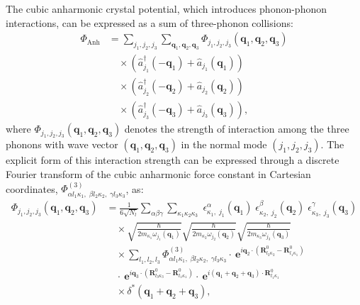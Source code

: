 The cubic anharmonic crystal potential, which introduces phonon-phonon interactions, can be expressed as a sum of three-phonon collisions:
\begin{equation}
\label{equ:2.18}
\begin{split}
\Phi_{\text{Anh}} &= \sum_{j_{1},j_{2},j_{3}} \sum_{\mathbf{q}_{1},\mathbf{q}_{2},\mathbf{q}_{3}} \Phi_{j_{1},j_{2},j_{3}}(\mathbf{q}_{1}, \mathbf{q}_{2}, \mathbf{q}_{3}) \\
&\quad \times \left(\hat{a}^\dagger_{j_{1}}(-\mathbf{q}_{1}) + \hat{a}_{j_{1}}(\mathbf{q}_{1})\right)\\
&\quad \times \left(\hat{a}^\dagger_{j_{2}}(-\mathbf{q}_{2}) + \hat{a}_{j_{2}}(\mathbf{q}_{2})\right)\\
&\quad \times \left(\hat{a}^\dagger_{j_{3}}(-\mathbf{q}_{3}) + \hat{a}_{j_{3}}(\mathbf{q}_{3}) \right),
\end{split}
\end{equation}
where $\Phi_{j_{1},j_{2},j_{3}}(\mathbf{q}_{1}, \mathbf{q}_{2}, \mathbf{q}_{3})$ denotes the strength of interaction among the three phonons with wave vector
$(\mathbf{q}_{1}, \mathbf{q}_{2}, \mathbf{q}_{3})$ in the normal mode $(j_{1},j_{2},j_{3})$.
The explicit form of this interaction strength can be expressed through a discrete Fourier transform of the cubic anharmonic force constant in Cartesian coordinates, $\Phi^{(3)}_{\alpha l_{1}\kappa_{1},\;\beta l_{2}\kappa_{2},\;\gamma l_{3}\kappa_{3}}$,  as:
\begin{equation}
\label{equ:2.19}
\begin{split}
\Phi_{j_{1},j_{2},j_{3}}(\mathbf{q}_{1}, \mathbf{q}_{2}, \mathbf{q}_{3}) &= \frac{1}{6\sqrt{N_{l}}} \sum_{\alpha\beta\gamma} \sum_{\kappa_{1}\kappa_{2}\kappa_{3}}\;\epsilon^{\alpha}_{\kappa_{1},\;j_{1}}(\mathbf{q}_{1})\;\epsilon^{\beta}_{\kappa_{2},\;j_{2}}(\mathbf{q}_{2}) \;\epsilon^{\gamma}_{\kappa_{3},\;j_{3}}(\mathbf{q}_{3}) \\
&\quad \times \sqrt{\frac{\hbar}{2m_{\kappa_{1}} \omega_{j_{1}}(\mathbf{q}_{1})}} 
\sqrt{\frac{\hbar}{2m_{\kappa_{2}} \omega_{j_{2}}(\mathbf{q}_{2})}} 
\sqrt{\frac{\hbar}{2m_{\kappa_{3}} \omega_{j_{3}}(\mathbf{q}_{3})}} \\
&\quad \times \sum_{l_{1}, l_{2}, l_{3}} \Phi^{(3)}_{\alpha l_{1}\kappa_{1},\;\beta l_{2}\kappa_{2},\;\gamma l_{3}\kappa_{3}}\cdot \:\textbf{e}^{i\mathbf{q}_{2}\cdot\left(\mathbf{R}^{0}_{l_{2}\kappa_{2}}-\mathbf{R}^{0}_{l_{1}\kappa_{1}}\right)}\\
&\quad \cdot \:\textbf{e}^{i\mathbf{q}_{3}\cdot\left(\mathbf{R}^{0}_{l_{3}\kappa_{3}}-\mathbf{R}^{0}_{l_{1}\kappa_{1}}\right)} \cdot \:\textbf{e}^{i\left(\mathbf{q}_{1} + \mathbf{q}_{2} + \mathbf{q}_{3}\right)\cdot\mathbf{R}^{0}_{l_{1}\kappa_{1}}}\\
&\quad \times \delta^{\ast}(\mathbf{q}_{1} + \mathbf{q}_{2} + \mathbf{q}_{3}),
\end{split}
\end{equation}
